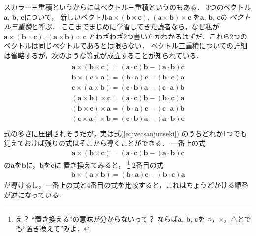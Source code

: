 スカラー三重積というからにはベクトル三重積というのもある．
3つのベクトル$\bm{a}, \, \bm{b}, \, \bm{c}$について，
新しいベクトル$ \bm{a} \times ( \bm{b} \times \bm{c} ) , \, ( \bm{a} \times \bm{b} ) \times \bm{c}$
を$\bm{a}, \, \bm{b} , \, \bm{c}$の
\emph{ベクトル三重積}と呼ぶ．
ここまでまじめに学習してきた読者なら，なぜ私が
$ \bm{a} \times ( \bm{b} \times \bm{c} ) , \, ( \bm{a} \times \bm{b} ) \times \bm{c}$
とわざわざ2つ書いたかわかるはずだ．これら2つのベクトルは同じベクトルであるとは限らない．
ベクトル三重積についての詳細は省略するが，次のような等式が成立することが知られている．
\begin{align}
\begin{aligned}
\bm{a} \times ( \bm{b} \times \bm{c} ) = 
( \bm{a} \cdot \bm{c} ) \bm{b} 
- ( \bm{a} \cdot \bm{b} ) \bm{c} \\
\bm{b} \times ( \bm{c} \times \bm{a} ) = 
( \bm{b} \cdot \bm{a} ) \bm{c} 
- ( \bm{b} \cdot \bm{c} ) \bm{a} \\
\bm{c} \times ( \bm{a} \times \bm{b} ) = 
( \bm{c} \cdot \bm{b} ) \bm{a} 
- ( \bm{c} \cdot \bm{a} ) \bm{b} \\
( \bm{a} \times \bm{b} ) \times \bm{c}  = 
( \bm{a} \cdot \bm{c} ) \bm{b} 
- ( \bm{b} \cdot \bm{c} ) \bm{a} \\
( \bm{b} \times \bm{c} ) \times \bm{a}  = 
( \bm{b} \cdot \bm{a} ) \bm{c} 
- ( \bm{c} \cdot \bm{a} ) \bm{b} \\
( \bm{c} \times \bm{a} ) \times \bm{b}  = 
( \bm{c} \cdot \bm{b} ) \bm{a} 
- ( \bm{a} \cdot \bm{b} ) \bm{c} \\
\label{eq:vecsanjuuseki}
\end{aligned}
\end{align}
式の多さに圧倒されそうだが，実は式(\ref{eq:vecsanjuuseki})
のうちどれか1つでも覚えておけば残りの式はそこから導くことができる．
一番上の式
\begin{align*}
\bm{a} \times ( \bm{b} \times \bm{c} ) = 
( \bm{a} \cdot \bm{c} ) \bm{b} 
- ( \bm{a} \cdot \bm{b} ) \bm{c}
\end{align*}
の$\bm{a}$を$\bm{b}$に，$\bm{b}$を$\bm{c}$に
置き換えてみると，
\footnote{え？ ``置き換える''の意味が分からないって？ ならば$\bm{a}, \, \bm{b}, \, \bm{c}$を
○，×，△とでも``置き換えて''みよ．}
2番目の式
\begin{align*}
\bm{b} \times ( \bm{a} \times \bm{b} ) = 
( \bm{b} \cdot \bm{a} ) \bm{c} 
- ( \bm{b} \cdot \bm{c} ) \bm{a}
\end{align*}
が導けるし，一番上の式と4番目の式を比較すると，これはちょうどかける順番が逆になっている．
